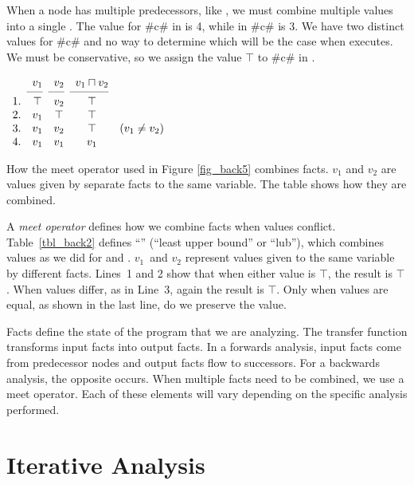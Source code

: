 \documentclass[12pt]{report}
\begin{document}
When a node has multiple predecessors, like ,
we must combine multiple \outBa values into a single \inBa. The value
for #c# in  is 4, while in 
#c# is 3. We have two distinct values for #c# and no way to determine
which will be the case when  executes. We
must be conservative, so we assign the value $\top$ to #c# in
.

\begin{table}[tbh]
  \centering
  \figbegin
  \begin{math}
    \begin{array}{ccccc}
      & v_1 & v_2 & v_1 \lub v_2 \\
      \cmidrule(r){2-2}\cmidrule(r){3-3}\cmidrule(r){4-4}
      1. & \top & v_2 & \top & \\ 
      2. & v_1 & \top & \top & \\
      3. & v_1 & v_2 & \top & \text{($v_1 \neq v_2$)}\\
      4. & v_1 & v_1 & v_1 
    \end{array}
  \end{math}
  \caption{How the meet operator used in Figure \ref{fig_back5}
    combines facts. $v_1$ and $v_2$ are values given by separate
    \outBa facts to the same variable. The table shows how they are
    combined.}
  \label{tbl_back2}
  \figend
\end{table}

A \emph{meet operator} defines how we combine facts when values
conflict. Table~\ref{tbl_back2} defines ``\lub'' (``least upper
bound'' or ``lub''), which combines values as we did for
 and . $v_1$~and $v_2$
represent values given to the same variable by different
facts. Lines~1 and 2 show that when either value is $\top$, the result
is $\top$. When values differ, as in Line~3, again the result is
$\top$. Only when values are equal, as shown in the last line, do we
preserve the value.

Facts define the state of the program that we are analyzing. The
transfer function transforms input facts into output facts. In a
forwards analysis, input facts come from predecessor nodes and output
facts flow to successors. For a backwards analysis, the opposite
occurs. When multiple facts need to be combined, we use a meet
operator. Each of these elements will vary depending on the specific
analysis performed.

\section{Iterative Analysis}
\label{sec_back6}
\end{document}
